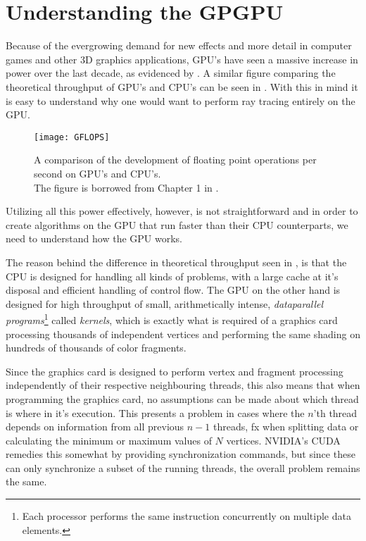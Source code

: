 \chapter{Understanding the GPGPU}\label{chp:GPGPU}





Because of the evergrowing demand for new effects and more detail in
computer games and other 3D graphics applications, GPU's have seen a
massive increase in power over the last decade, as evidenced by
. A similar figure comparing the theoretical
throughput of GPU's and CPU's can be seen in . With
this in mind it is easy to understand why one would want to perform
ray tracing entirely on the GPU.

\begin{figure}
  \centering
  \texttt{[image: GFLOPS]}
  \caption[Comparison of floating point operations per second on GPU's
    and CPU's.]{A comparison of the development of floating point
    operations per second on GPU's and CPU's. \\The figure is borrowed
    from Chapter 1 in .}
  \label{fig:gflops}
\end{figure}


Utilizing all this power effectively, however, is not straightforward
and in order to create algorithms on the GPU that run faster than their
CPU counterparts, we need to understand how the GPU works.

The reason behind the difference in theoretical throughput seen in
, is that the CPU is designed for handling all
kinds of problems, with a large cache at it's disposal and efficient
handling of control flow. The GPU on the other hand is designed for
high throughput of small, arithmetically intense, \textit{dataparallel
  programs}\footnote{Each processor performs the same instruction
  concurrently on multiple data elements.} called \textit{kernels},
which is exactly what is required of a graphics card processing
thousands of independent vertices and performing the same shading on
hundreds of thousands of color fragments.

Since the graphics card is designed to perform vertex and fragment
processing independently of their respective neighbouring threads,
this also means that when programming the graphics card, no
assumptions can be made about which thread is where in it's
execution. This presents a problem in cases where the $n$'th thread
depends on information from all previous $n-1$ threads, fx when
splitting data or calculating the minimum or maximum values of $N$
vertices. NVIDIA's CUDA remedies this somewhat by providing
synchronization commands, but since these can only synchronize a
subset of the running threads, the overall problem remains the same.

